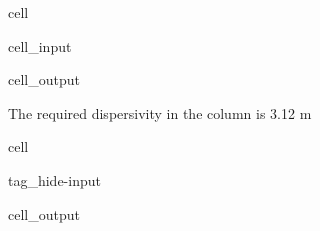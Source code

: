 \documentclass[letterpaper,10pt,english]{jupyterBook}
\begin{document}
\begin{sphinxuseclass}{cell}\begin{sphinxVerbatimInput}

\begin{sphinxuseclass}{cell_input}
\begin{sphinxVerbatim}[commandchars=\\\{\}]

   
   
   

   

 
\end{sphinxVerbatim}

\end{sphinxuseclass}\end{sphinxVerbatimInput}
\begin{sphinxVerbatimOutput}

\begin{sphinxuseclass}{cell_output}
\begin{sphinxVerbatim}[commandchars=\\\{\}]
The required dispersivity in the column is 3.12 m
\end{sphinxVerbatim}

\end{sphinxuseclass}\end{sphinxVerbatimOutput}

\end{sphinxuseclass}
\begin{sphinxuseclass}{cell}
\begin{sphinxuseclass}{tag_hide-input}\begin{sphinxVerbatimOutput}

\begin{sphinxuseclass}{cell_output}
\noindent{}

\end{sphinxuseclass}\end{sphinxVerbatimOutput}

\end{sphinxuseclass}
\end{sphinxuseclass}
\end{document}

